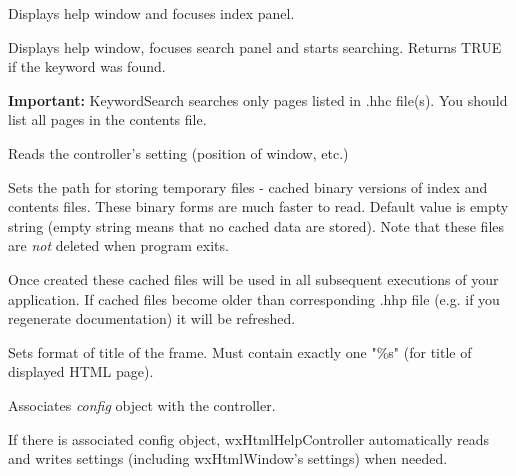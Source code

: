 Displays help window and focuses index panel.

\label{wxhtmlhelpcontrollerkeywordsearch}


Displays help window, focuses search panel and starts searching.
Returns TRUE if the keyword was found.

{\bf Important:} KeywordSearch searches only pages listed in .hhc file(s).
You should list all pages in the contents file.

\label{wxhtmlhelpcontrollerreadcustomization}


Reads the controller's setting (position of window, etc.)

\label{wxhtmlhelpcontrollersettempdir}


Sets the path for storing temporary files - cached binary versions of index and contents files. These binary
forms are much faster to read. Default value is empty string (empty string means
that no cached data are stored). Note that these files are {\it not} 
deleted when program exits.

Once created these cached files will be used in all subsequent executions 
of your application. If cached files become older than corresponding .hhp
file (e.g. if you regenerate documentation) it will be refreshed.

\label{wxhtmlhelpcontrollersettitleformat}


Sets format of title of the frame. Must contain exactly one "\%s"
(for title of displayed HTML page).

\label{wxhtmlhelpcontrolleruseconfig}


Associates {\it config} object with the controller.

If there is associated config object, wxHtmlHelpController automatically
reads and writes settings (including wxHtmlWindow's settings) when needed.

